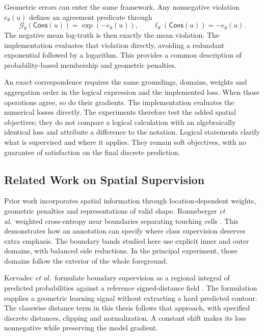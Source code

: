 \documentclass[12pt,a4paper]{article}
\begin{document}
Geometric errors can enter the same framework. Any nonnegative violation
$e_\theta(u)$ defines an agreement predicate through
\begin{equation}
\mathcal{G}_{\theta}(\mathsf{Cons}(u))=\exp(-e_{\theta}(u)),
\qquad
\ell_{\theta}(\mathsf{Cons}(u))=-e_{\theta}(u).
\label{eq:penalty-predicate}
\end{equation}
The negative mean log-truth is then exactly the mean violation. The
implementation evaluates that violation directly, avoiding a redundant
exponential followed by a logarithm. This provides a common
description of probability-based membership and geometric penalties.

An exact correspondence requires the same groundings, domains, weights
and aggregation order in the logical expression and the implemented loss.
When those operations agree, so do their gradients. The implementation
evaluates the numerical losses directly. The experiments therefore test
the added spatial objectives; they do not compare a logical calculation
with an algebraically identical loss and attribute a difference to the
notation. Logical statements clarify what is supervised and where it
applies. They remain soft objectives, with no guarantee of satisfaction
on the final discrete prediction.

\subsection{Related Work on Spatial Supervision}\label{sec:spatial-related-work}

Prior work incorporates spatial information through location-dependent
weights, geometric penalties and representations of valid shape.
Ronneberger \emph{et al.}\ weighted cross-entropy near boundaries separating
touching cells \cite{ronneberger2015unet}. This demonstrates how an
annotation can specify where class supervision deserves extra emphasis.
The boundary bands studied here use explicit inner and outer domains,
with balanced side reductions. In the principal experiment, those domains
follow the exterior of the whole foreground.

Kervadec \emph{et al.}\ formulate boundary supervision as a regional integral
of predicted probabilities against a reference signed-distance field
\cite{kervadec2019boundary}. The formulation supplies a geometric
learning signal without extracting a hard predicted contour. The
classwise distance term in this thesis follows that approach, with
specified discrete distances, clipping and normalization. A constant
shift makes its loss nonnegative while preserving the model gradient.
\end{document}
